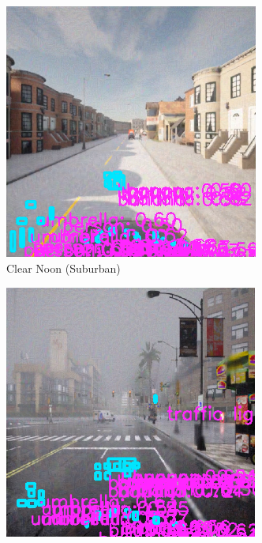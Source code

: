 \begin{figure}[H]
\begin{subfigure}[b]{0.48\textwidth}
        \includegraphics[width=\linewidth]{figures/chapter_detection/hardware/clear_noon_urban.png}
        \caption{Clear Noon (Suburban)}
        \label{fig:clear_noon_suburban}
    \end{subfigure}
    \begin{subfigure}[b]{0.48\textwidth}
        \centering
        \includegraphics[width=\linewidth]{figures/chapter_detection/hardware/hard_rain_city.png}

\end{subfigure}
\end{figure}

